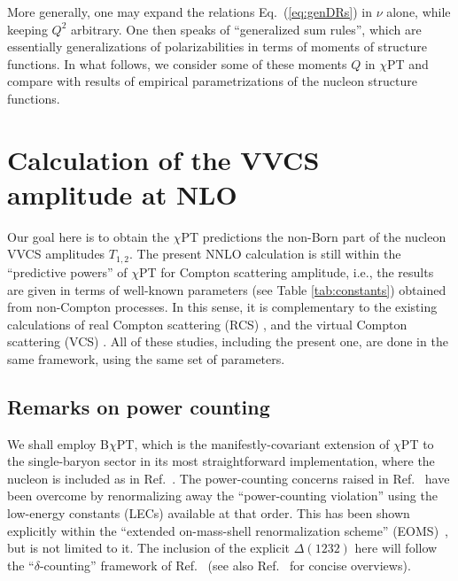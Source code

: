 \documentclass[12pt,preprint,tightenlines,
showpacs,preprintnumbers,amsmath,amssymb,
a4paper,nofootinbib]{revtex4-1}
\def\Eqref#1{Eq.~(\ref{eq:#1})}
\def\de{\delta} \def\De{\Delta}
\begin{document}
 More generally, one may expand the relations \Eqref{genDRs} in $\nu$ alone, while keeping $Q^2$ arbitrary. One then speaks of ``generalized sum rules'', which are essentially generalizations of polarizabilities in terms
 of moments of structure functions. In what follows, we consider some of these
 moments  $Q$ in $\chi$PT and compare
 with results of  empirical parametrizations of the nucleon structure functions.
 



\section{Calculation of the VVCS amplitude at NLO} 
\label{Sec:ChEFT_for_VVCS}

Our goal here is to obtain the $\chi$PT predictions 
the non-Born part of the nucleon VVCS amplitudes $T_{1,2}$.
The present NNLO calculation is still within the ``predictive powers'' of $\chi$PT for Compton scattering amplitude, i.e., 
the results are given in terms of well-known parameters
(see Table \ref{tab:constants}) obtained from non-Compton processes.
In this sense, it is complementary to the existing calculations of  real Compton scattering (RCS) \cite{Lensky:2009uv,Lensky:2015awa},
and the virtual Compton scattering (VCS) \cite{Lensky:2016nui}. All of these studies, 
including the present one, are done in the same framework, using the same set of parameters. 




\subsection{Remarks on power counting}

  We shall employ B$\chi$PT, which is the manifestly-covariant extension of $\chi$PT to the single-baryon sector in its most straightforward implementation, where
the nucleon is included as in Ref.~\cite{Gasser:1987rb}. The power-counting concerns  
raised in Ref.~\cite{Gasser:1987rb} have been overcome by renormalizing away the ``power-counting
violation'' using the low-energy constants (LECs)
available at that order.
 This has been shown explicitly within the  ``extended on-mass-shell renormalization scheme'' (EOMS)~\cite{Fuchs:2003qc}, 
 but is not limited to it. 
 The inclusion of the explicit $\De(1232)$ here will follow
 the ``$\de$-counting'' framework 
of Ref.~\cite{Pascalutsa:2003aa} (see also Ref.~\cite{Pascalutsa:2006up,Geng:2013xn} for concise overviews).
\end{document}
